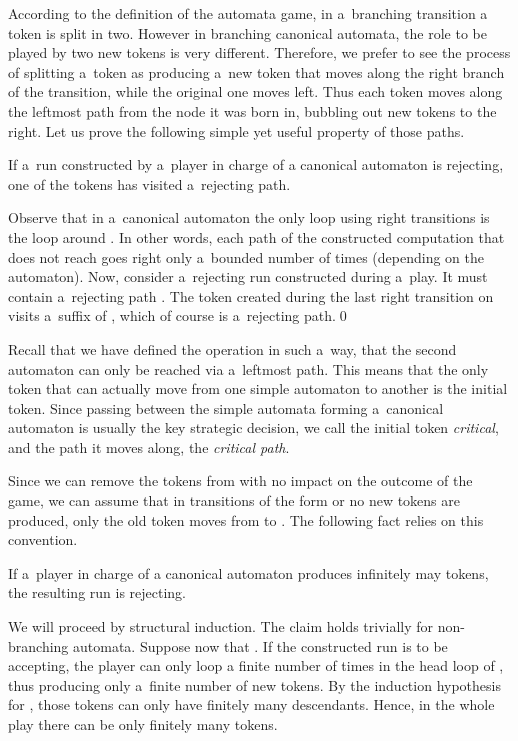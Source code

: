 \documentclass{LMCS}
\begin{document}
According to the definition of the automata game, in a~branching
transition a token is split in two. However in branching canonical
automata, the role to be played by two new tokens is very
different. Therefore, we prefer to see the process of splitting
a~token as producing a~new token that moves along the right branch of
the transition, while the original one moves left. Thus each token
moves along the leftmost path from the node it was born in, bubbling
out new tokens to the right. Let us prove the following simple yet 
useful property of those paths. 

\begin{prop}\label{rejectingpath}
If a~run constructed by a~player in charge of a canonical automaton is
rejecting, one of the tokens has visited a~rejecting path.  
\end{prop}

\proof  Observe that in a~canonical automaton the only loop using
right transitions is the loop around . In other words, each path
of the constructed computation that does not reach  goes right
only a~bounded number of times (depending on the automaton). Now,
consider a~rejecting run constructed during a~play. It must
contain a~rejecting path . The token created during the last
right transition on  visits a~suffix of , which of course is
a~rejecting path.\qed 

\vspace{5pt}

Recall that we have defined the operation  in such a~way, that
the second automaton can only be reached via a~leftmost path. This
means that the only token that can actually move from one simple
automaton to another is the initial token. Since passing between the
simple automata forming a~canonical automaton is usually the key
strategic decision, we call the initial token {\em critical}, and the
path it moves along, the {\em critical path}.

Since we can remove the tokens from  with no impact on the
outcome of the game, we can assume that in transitions of the form  or 
  no new tokens are
produced, only the old token moves from  to . The following fact
relies on this convention. 

\begin{prop}\label{finitelymanytokens} 
If a~player in charge of a canonical automaton produces infinitely may
tokens, the resulting run is rejecting.  
\end{prop}

\proof We will proceed by structural induction. The claim holds
trivially for non-branching automata. Suppose now that . If the constructed run is to be accepting, the player can only
loop a finite number of times in the head loop of
, thus producing only a~finite number of new tokens. 
By the induction hypothesis for , those tokens can only have
finitely many descendants. Hence, in the whole play there can be only
finitely many tokens. 
\end{document}
